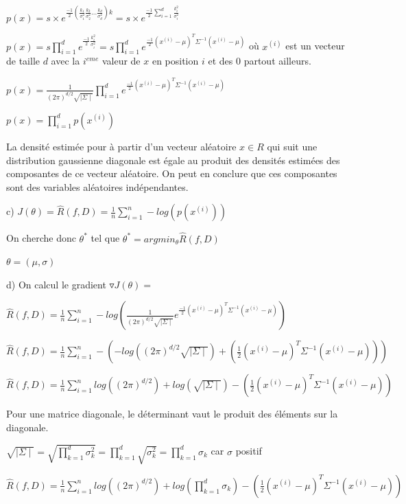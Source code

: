 \documentclass[a4paper,10pt]{article}
\begin{document}
$p(x) = s \times e^{\frac{-1}{2} (\frac{k_{1}}{\sigma_{1}^{2}} \frac{k_{2}}{\sigma_{2}^{2}} ... \frac{k_{d}}{\sigma_{d}^{2}} )k }  = s \times e^{\frac{-1}{2} \sum_{i=1}^{d} \frac{k_{i}^{2} }{\sigma_{i}^{2}} }$

$p(x) = s \prod_{i=1}^{d} e^{\frac{-1}{2} \frac{k_{i}^{2} }{\sigma_{i}^{2}} }  = s \prod_{i=1}^{d} e^{\frac{-1}{2} (x^{(i)} - \mu)^{T} \Sigma^{-1} (x^{(i)} - \mu) } $ où $x^{(i)}$ est un vecteur de taille $d$ avec la $i^{eme}$ valeur de $x$ en position $i$ et des 0 partout ailleurs.

$p(x) =\frac{1}{(2 \pi)^{d/2} \sqrt{\mid{\Sigma} \mid}} \prod_{i=1}^{d} e^{\frac{-1}{2} (x^{(i)} - \mu)^{T} \Sigma^{-1} (x^{(i)} - \mu) }  $

$p(x) = \prod_{i=1}^{d} p(x^{(i)}) $


La densité estimée pour à partir d'un vecteur aléatoire $x \in R$ qui suit une distribution gaussienne diagonale est égale au produit des densités estimées des composantes de ce vecteur aléatoire. On peut en conclure que ces composantes sont des variables aléatoires indépendantes.


c) $ J(\theta) =\widehat{R}(f,D) = \frac{1}{n} \sum_{i=1}^{n} -log (p(x^{(i)}))$

On cherche donc $\theta^{*}$ tel que $\theta^{*} = argmin_{\theta} \widehat{R}(f,D)$

$ \theta = ( \mu, \sigma )$

d) On calcul le gradient $ \triangledown J(\theta) = $

$\widehat{R}(f,D) = \frac{1}{n} \sum_{i=1}^{n} -log (\frac{1}{(2 \pi)^{d/2} \sqrt{\mid{\Sigma} \mid}} e^{\frac{-1}{2} (x^{(i)}- \mu)^{T} \Sigma^{-1} (x^{(i)}- \mu) })$

$ \widehat{R}(f,D) = \frac{1}{n} \sum_{i=1}^{n} - ( -log((2 \pi)^{d/2} \sqrt{\mid{\Sigma} \mid} ) + (\frac{1}{2} (x^{(i)}- \mu)^{T} \Sigma^{-1} (x^{(i)}- \mu) ) )$

$ \widehat{R}(f,D) = \frac{1}{n} \sum_{i=1}^{n} log((2 \pi)^{d/2} )+log(\sqrt{\mid{\Sigma} \mid} ) - (\frac{1}{2} (x^{(i)}- \mu)^{T} \Sigma^{-1} (x^{(i)}- \mu) ) $

Pour une matrice diagonale, le déterminant vaut le produit des éléments sur la diagonale.

$\sqrt{\mid{\Sigma} \mid} = \sqrt{ \prod_{k=1}^{d} \sigma^{2}_{k} } =   \prod_{k=1}^{d} \sqrt{\sigma^{2}_{k} } = \prod_{k=1}^{d} \sigma_{k} $ car $\sigma$ positif

$ \widehat{R}(f,D) = \frac{1}{n} \sum_{i=1}^{n} log((2 \pi)^{d/2} )+log(\prod_{k=1}^{d} \sigma_{k} ) - (\frac{1}{2} (x^{(i)}- \mu)^{T} \Sigma^{-1} (x^{(i)}- \mu) ) $
\end{document}
